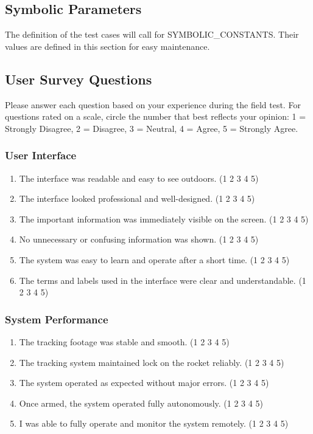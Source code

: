 \documentclass[12pt, titlepage]{article}
\begin{document}
\subsection{Symbolic Parameters}

The definition of the test cases will call for SYMBOLIC\_CONSTANTS. Their
values are defined in this section for easy maintenance.

\subsection{User Survey Questions}


Please answer each question based on your experience during the field test. For
questions rated on a scale, circle the number that best reflects your opinion:
1 = Strongly Disagree, 2 = Disagree, 3 = Neutral, 4 = Agree, 5 = Strongly
Agree.

\subsubsection*{User Interface}

\begin{enumerate}
  \item The interface was readable and easy to see outdoors. \hfill (1 2 3 4 5)
  \item The interface looked professional and well-designed. \hfill (1 2 3 4 5)
  \item The important information was immediately visible on the screen. \hfill (1 2 3
        4 5)
  \item No unnecessary or confusing information was shown. \hfill (1 2 3 4 5)
  \item The system was easy to learn and operate after a short time. \hfill (1 2 3 4 5)
  \item The terms and labels used in the interface were clear and understandable.
        \hfill (1 2 3 4 5)
\end{enumerate}

\subsubsection*{System Performance}

\begin{enumerate}
  \item The tracking footage was stable and smooth. \hfill (1 2 3 4 5)
  \item The tracking system maintained lock on the rocket reliably. \hfill (1 2 3 4 5)
  \item The system operated as expected without major errors. \hfill (1 2 3 4 5)
  \item Once armed, the system operated fully autonomously. \hfill (1 2 3 4 5)
  \item I was able to fully operate and monitor the system remotely. \hfill (1 2 3 4 5)
\end{enumerate}
\end{document}
